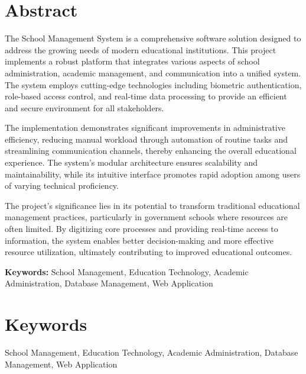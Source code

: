 \documentclass[12pt,a4paper]{report}
\begin{document}
\newpage
\section*{Abstract}
The School Management System is a comprehensive software solution designed to address the growing needs of modern educational institutions. This project implements a robust platform that integrates various aspects of school administration, academic management, and communication into a unified system. The system employs cutting-edge technologies including biometric authentication, role-based access control, and real-time data processing to provide an efficient and secure environment for all stakeholders.

The implementation demonstrates significant improvements in administrative efficiency, reducing manual workload through automation of routine tasks and streamlining communication channels, thereby enhancing the overall educational experience. The system's modular architecture ensures scalability and maintainability, while its intuitive interface promotes rapid adoption among users of varying technical proficiency.

The project's significance lies in its potential to transform traditional educational management practices, particularly in government schools where resources are often limited. By digitizing core processes and providing real-time access to information, the system enables better decision-making and more effective resource utilization, ultimately contributing to improved educational outcomes.

\textbf{Keywords:} School Management, Education Technology, Academic Administration, Database Management, Web Application

\newpage
\section*{Keywords}
School Management, Education Technology, Academic Administration, Database Management, Web Application
\end{document}
